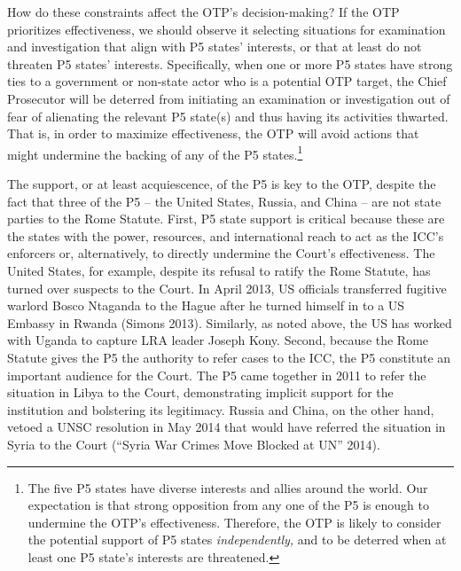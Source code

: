 How do these constraints affect the OTP's decision-making? If the OTP prioritizes effectiveness, we should observe it selecting situations for examination and investigation that align with P5 states' interests, or that at least do not threaten P5 states' interests. Specifically, when one or more P5 states have strong ties to a government or non-state actor who is a potential OTP target, the Chief Prosecutor will be deterred from initiating an examination or investigation out of fear of alienating the relevant P5 state(s) and thus having its activities thwarted. That is, in order to maximize effectiveness, the OTP will avoid actions that might undermine the backing of any of the P5 states.\footnote{The five P5 states have diverse interests and allies around the world. Our expectation is that strong opposition from any one of the P5 is enough to undermine the OTP's effectiveness. Therefore, the OTP is likely to consider the potential support of P5 states \emph{independently,} and to be deterred when at least one P5 state's interests are threatened.}

The support, or at least acquiescence, of the P5 is key to the OTP, despite the fact that three of the P5 -- the United States, Russia, and China -- are not state parties to the Rome Statute. First, P5 state support is critical because these are the states with the power, resources, and international reach to act as the ICC's enforcers or, alternatively, to directly undermine the Court's effectiveness. The United States, for example, despite its refusal to ratify the Rome Statute, has turned over suspects to the Court. In April 2013, US officials transferred fugitive warlord Bosco Ntaganda to the Hague after he turned himself in to a US Embassy in Rwanda (Simons 2013). Similarly, as noted above, the US has worked with Uganda to capture LRA leader Joseph Kony. Second, because the Rome Statute gives the P5 the authority to refer cases to the ICC, the P5 constitute an important audience for the Court. The P5 came together in 2011 to refer the situation in Libya to the Court, demonstrating implicit support for the institution and bolstering its legitimacy. Russia and China, on the other hand, vetoed a UNSC resolution in May 2014 that would have referred the situation in Syria to the Court (``Syria War Crimes Move Blocked at UN'' 2014).

